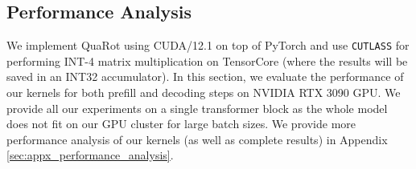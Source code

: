 \begin{table}[t]
    \centering
    \small
    \caption{Zero-shot accuracy of \llama  models with 4-bit (A4W4KV4) QuaRot on PIQA (PQ), WinoGrande (WG), HellaSwag (HS), Arc-Easy (A-e), Arc-Challenge (A-c), and LAMBADA (LA).}
    \vspace{0.5em}
\label{tab:zero_shot}
\end{table}



\subsection{Performance Analysis}\label{sec:performance_analysis}

 We implement QuaRot using CUDA/12.1 on top of PyTorch and use \texttt{CUTLASS} for performing INT-4 matrix multiplication on TensorCore (where the results will be saved in an INT32 accumulator). In this section, we evaluate the performance of our kernels for both prefill and decoding steps on NVIDIA RTX 3090 GPU. We provide all our experiments on a single transformer block as the whole model does not fit on our GPU cluster for large batch sizes. We provide more performance analysis of our kernels (as well as complete results) in Appendix  \ref{sec:appx_performance_analysis}. 
 






